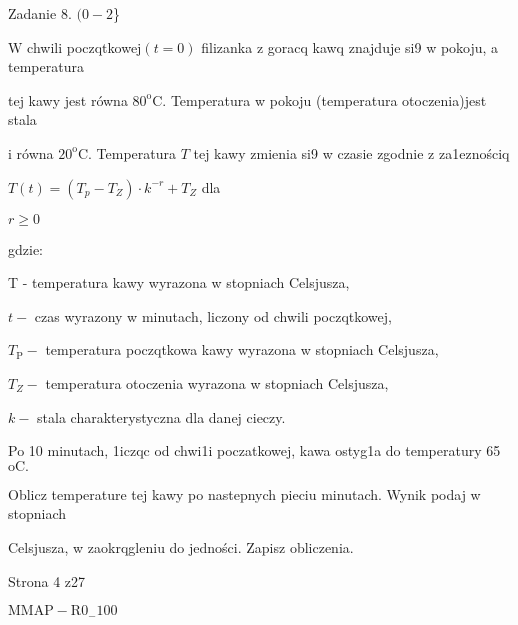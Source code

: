 \documentclass[a4paper,12pt]{article}
\begin{document}
Zadanie 8. $(0-2$\}

$\mathrm{W}$ chwili poczqtkowej$(t=0)$ filizanka z goracq kawq znajduje si9 w pokoju, a temperatura

tej kawy jest równa $80^{\mathrm{o}}\mathrm{C}$. Temperatura w pokoju (temperatura otoczenia)jest stala

i równa $20^{\mathrm{o}}\mathrm{C}$. Temperatura $T$ tej kawy zmienia si9 w czasie zgodnie z za1eznościq

$T(t)=(T_{p}-T_{Z})\cdot k^{-r}+T_{Z}$ dla

$r\geq 0$

gdzie:

T - temperatura kawy wyrazona w stopniach Celsjusza,

$t -$ czas wyrazony w minutach, liczony od chwili poczqtkowej,

$T_{\mathrm{P}}-$ temperatura poczqtkowa kawy wyrazona w stopniach Celsjusza,

$T_{Z}-$ temperatura otoczenia wyrazona w stopniach Celsjusza,

$k -$ stala charakterystyczna dla danej cieczy.

Po 10 minutach, 1iczqc od chwi1i poczatkowej, kawa ostyg1a do temperatury 65 $\mathrm{o}\mathrm{C}.$

Oblicz temperature tej kawy po nastepnych pieciu minutach. Wynik podaj w stopniach

Celsjusza, w zaokrqgleniu do jedności. Zapisz obliczenia.

Strona 4 z27

$\mathrm{M}\mathrm{M}\mathrm{A}\mathrm{P}-\mathrm{R}0_{-}100$
\end{document}
